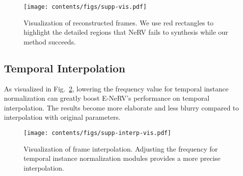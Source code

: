\documentclass[runningheads]{llncs}
\begin{document}
\begin{figure}[!htbp]
    \centering
    \texttt{[image: contents/figs/supp-vis.pdf]}
    \caption{Visualization of reconstructed frames. We use red rectangles to highlight the detailed regions that NeRV fails to synthesis while our method succeeds.}
    \label{fig:supp_vis}
\end{figure}

\subsection{Temporal Interpolation}

As visualized in Fig.~\ref{fig:supp_interp_vis}, lowering the frequency value for temporal instance normalization can greatly boost E-NeRV's performance on temporal interpolation. The results become more elaborate and less blurry compared to interpolation with original parameters.

\begin{figure}[!htbp]
    \centering
    \texttt{[image: contents/figs/supp-interp-vis.pdf]}
    \caption{Visualization of frame interpolation. Adjusting the frequency for temporal instance normalization modules provides a more precise interpolation.}
    \label{fig:supp_interp_vis}
\end{figure} 
\end{document}
